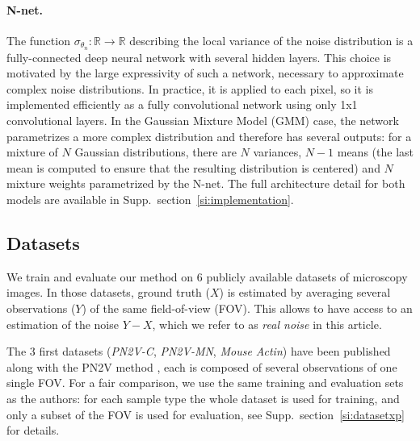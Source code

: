 \documentclass{article}
\begin{document}
\paragraph{N-net.}
The function $\sigma_{\theta_n}: \mathbb{R} \to \mathbb{R}$ describing the local variance of the noise distribution is a fully-connected deep neural network with several hidden layers. This choice is motivated by the large expressivity of such a network, necessary to approximate complex noise distributions. In practice, it is applied to each pixel, so it is implemented efficiently as a fully convolutional network using only 1x1 convolutional layers. In the Gaussian Mixture Model (GMM) case, the network parametrizes a more complex distribution and therefore has several outputs: for a mixture of $N$ Gaussian distributions, there are $N$ variances, $N-1$ means (the last mean is computed to ensure that the resulting distribution is centered) and $N$ mixture weights parametrized by the N-net. The full architecture detail for both models are available in Supp.~section~\ref{si:implementation}.


\subsection{Datasets}
We train and evaluate our method on 6 publicly available datasets of microscopy images. In those datasets, ground truth ($X$) is estimated by averaging several observations ($Y$) of the same field-of-view (FOV).
This allows to have access to an estimation of the noise $Y-X$, which we refer to as \textit{real noise} in this article.

The 3 first datasets (\emph{PN2V-C}, \emph{PN2V-MN}, \emph{Mouse Actin}) have been published along with the PN2V method \cite{krull2019probabilistic}, each is composed of several observations of one single FOV.
For a fair comparison, we use the same training and evaluation sets as the authors: for each sample type the whole dataset is used for training, and only a subset of the FOV is used for evaluation, see Supp.~section~\ref{si:datasetxp} for details.
\end{document}

